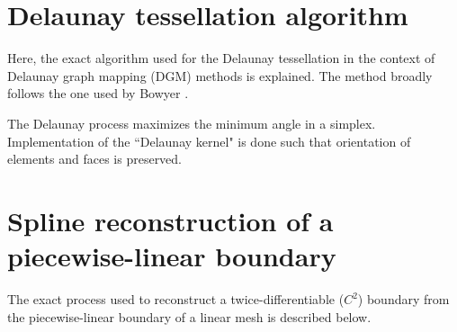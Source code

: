 \chapter{Delaunay tessellation algorithm}

Here, the exact algorithm used for the Delaunay tessellation in the context of Delaunay graph mapping (DGM) methods is explained. The method broadly follows the one used by Bowyer \cite{bowyer}. 

The Delaunay process maximizes the minimum angle in a simplex. Implementation of the ``Delaunay kernel" is done such that orientation of elements and faces is preserved.

\chapter[Spline reconstruction]{Spline reconstruction of a piecewise-linear boundary}

The exact process used to reconstruct a twice-differentiable ($C^2$) boundary from the piecewise-linear boundary of a linear mesh is described below.